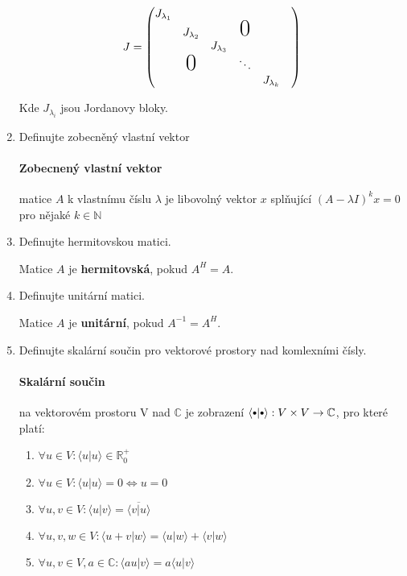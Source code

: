 \documentclass[10pt,a4paper]{article}
\newcommand\sbullet[1][.5]{\mathbin{\vcenter{\hbox{\scalebox{#1}{$\bullet$}}}}}
\theoremstyle{plain}
\theoremstyle{definition}
\begin{document}
\begin{enumerate}
\[ J = \begin{pmatrix}
J_{\lambda_1} && 	&&\\
& J_{\lambda_2} &&\mbox{\huge{0}} &\\
&& J_{\lambda_3}&&&\\
&\mbox{\huge{0}}&& \ddots & \\
& &	&& J_{\lambda_k}
\end{pmatrix}\]

Kde $J_{\lambda_i}$ jsou Jordanovy bloky.

\item Definujte zobecněný vlastní vektor

\paragraph{Zobecnený vlastní vektor} matice $A$ k vlastnímu číslu $\lambda$ je libovolný vektor $x$ splňující $(A-\lambda I)^kx = 0$ pro nějaké $k \in \mathbb{N}$ 

\item Definujte hermitovskou matici.

Matice $A$ je \textbf{hermitovská}, pokud $A^H = A$.

\item Definujte unitární matici.


Matice $A$ je \textbf{unitární}, pokud $A^{-1} = A^H$.


\item Definujte skalární součin pro vektorové prostory nad komlexními čísly.

\paragraph{Skalární součin} na vektorovém prostoru V nad $\mathbb{C}$ je zobrazení $\langle \sbullet[.75] | \sbullet[.75] \rangle : V \times V \to \mathbb{C}$, pro které platí:

\begin{enumerate}[label=(\roman*)]
\item $\forall u \in V:\langle u | u \rangle \in \mathbb{R}^+_0$
\item $\forall u \in V:\langle u | u \rangle = 0 \iff u = 0$
\item $\forall u,v \in V:\langle u | v \rangle = \overline{\langle v | u \rangle}$
\item $\forall u,v,w \in V:\langle u + v | w \rangle = \langle u | w \rangle  + \langle  v | w \rangle $
\item $\forall u,v \in V, a \in \mathbb{C}: \langle au | v \rangle = a \langle u | v \rangle $
\end{enumerate}



\end{enumerate}
\end{document}
